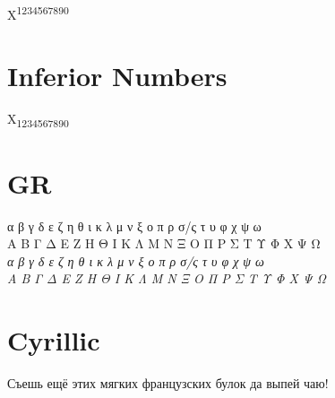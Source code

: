 \documentclass{article}
\begin{document}
X\textsuperscript{1234567890}

\section*{Inferior Numbers}

X\textsubscript{1234567890}

\section*{GR}


 α β γ δ ε ζ η θ ι κ λ μ ν ξ ο π ρ σ/ς τ υ φ χ ψ ω\\
 Α Β Γ Δ Ε Ζ Η Θ Ι Κ Λ Μ Ν Ξ Ο Π Ρ Σ Τ Υ Φ Χ Ψ Ω\\
\textit{ α β γ δ ε ζ η θ ι κ λ μ ν ξ ο π ρ σ/ς τ υ φ χ ψ ω\\
 Α Β Γ Δ Ε Ζ Η Θ Ι Κ Λ Μ Ν Ξ Ο Π Ρ Σ Τ Υ Φ Χ Ψ Ω}\par


\section*{Cyrillic}


Съешь ещё этих мягких французских булок да
выпей чаю!\par
\end{document}
